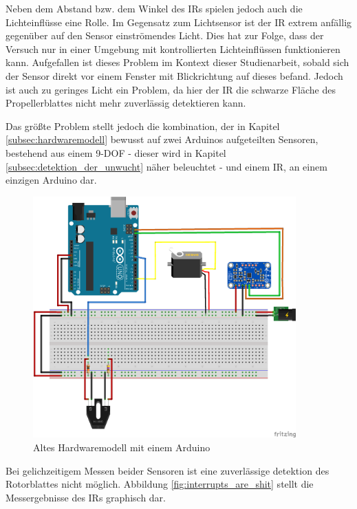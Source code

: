 Neben dem Abstand bzw. dem Winkel des \ac{IR}s spielen jedoch auch die Lichteinflüsse eine Rolle.
Im Gegensatz zum Lichtsensor ist der \ac{IR} extrem anfällig gegenüber auf den Sensor einströmendes Licht.
Dies hat zur Folge, dass der Versuch nur in einer Umgebung mit kontrollierten Lichteinflüssen funktionieren kann.
Aufgefallen ist dieses Problem im Kontext dieser Studienarbeit, sobald sich der Sensor direkt vor einem Fenster mit Blickrichtung auf dieses befand.
Jedoch ist auch zu geringes Licht ein Problem, da hier der \ac{IR} die schwarze Fläche des Propellerblattes nicht mehr zuverlässig detektieren kann.

Das größte Problem stellt jedoch die kombination, der in Kapitel \ref{subsec:hardwaremodell} bewusst auf zwei Arduinos aufgeteilten Sensoren, bestehend aus einem \ac{9-DOF} - dieser wird in Kapitel \ref{subsec:detektion_der_unwucht} näher beleuchtet - und einem \ac{IR}, an einem einzigen Arduino dar.
\begin{figure}[H]
	\centering
	\includegraphics[width=0.9\textwidth]{images/chapter/03/hardware-layout-with-one-arduino.png}
	\caption{Altes Hardwaremodell mit einem Arduino}
\end{figure}
Bei gelichzeitigem Messen beider Sensoren ist eine zuverlässige detektion des Rotorblattes nicht möglich.
Abbildung \ref{fig:interrupts_are_shit} stellt die Messergebnisse des \ac{IR}s graphisch dar.
